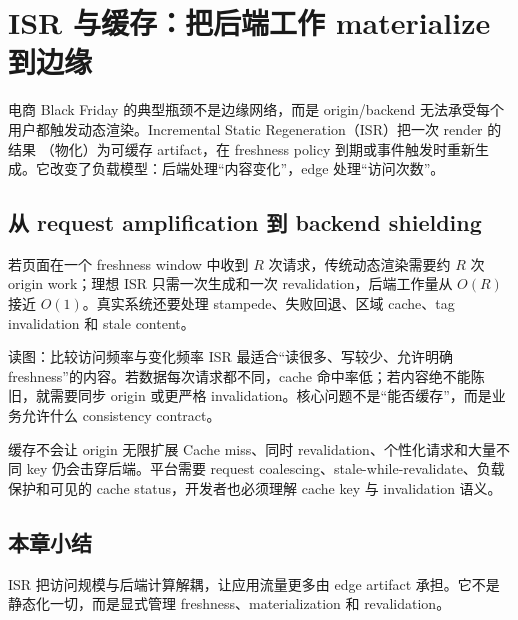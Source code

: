 \section{ISR 与缓存：把后端工作 materialize 到边缘}

电商 Black Friday 的典型瓶颈不是边缘网络，而是 origin/backend 无法承受每个用户都触发动态渲染。Incremental Static Regeneration（ISR）把一次 render 的结果 （物化）为可缓存 artifact，在 freshness policy 到期或事件触发时重新生成。它改变了负载模型：后端处理“内容变化”，edge 处理“访问次数”。

\subsection{从 request amplification 到 backend shielding}

若页面在一个 freshness window 中收到 $R$ 次请求，传统动态渲染需要约 $R$ 次 origin work；理想 ISR 只需一次生成和一次 revalidation，后端工作量从 $O(R)$ 接近 $O(1)$。真实系统还要处理 stampede、失败回退、区域 cache、tag invalidation 和 stale content。


\begin{knowledgebox}{读图：比较访问频率与变化频率}
ISR 最适合“读很多、写较少、允许明确 freshness”的内容。若数据每次请求都不同，cache 命中率低；若内容绝不能陈旧，就需要同步 origin 或更严格 invalidation。核心问题不是“能否缓存”，而是业务允许什么 consistency contract。
\end{knowledgebox}

\begin{warningbox}{缓存不会让 origin 无限扩展}
Cache miss、同时 revalidation、个性化请求和大量不同 key 仍会击穿后端。平台需要 request coalescing、stale-while-revalidate、负载保护和可见的 cache status，开发者也必须理解 cache key 与 invalidation 语义。
\end{warningbox}


\subsection{本章小结}

ISR 把访问规模与后端计算解耦，让应用流量更多由 edge artifact 承担。它不是静态化一切，而是显式管理 freshness、materialization 和 revalidation。

